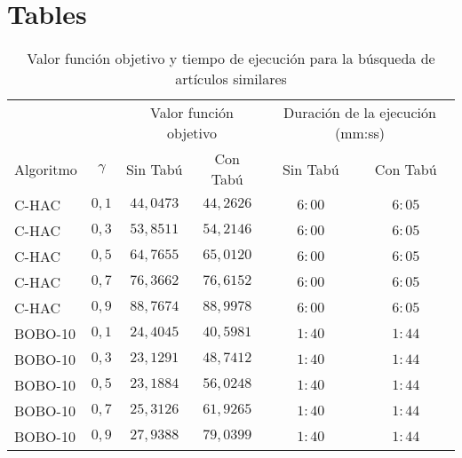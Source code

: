 \appendix
\section{Tables}\label{appendix-tables}
\begin{table}[H]
	\centering
	\resizebox{.4\textwidth}{!} {
		\begin{tabular}{|lc|cccc|}
			\hline
			~  & ~ & \multicolumn{2}{|c}{Valor función objetivo} & \multicolumn{2}{c|}{Duración de la ejecución (mm:ss)} \\
			Algoritmo & $\gamma$ & Sin Tabú & Con Tabú & Sin Tabú & Con Tabú \\ 
			\hline
			C-HAC & $0,1$ & $44,0473$  & $44,2626$ & $6:00$ & $6:05$ \\
			C-HAC & $0,3$ & $53,8511$  & $54,2146$ & $6:00$ & $6:05$ \\
			C-HAC & $0,5$ & $64,7655$  & $65,0120$ & $6:00$ & $6:05$ \\
			C-HAC & $0,7$ & $76,3662$  & $76,6152$ & $6:00$ & $6:05$ \\
			C-HAC & $0,9$ & $88,7674$  & $88,9978$ & $6:00$ & $6:05$ \\
			BOBO-10 & $0,1$ & $24,4045$  & $40,5981$ & $1:40$ & $1:44$ \\
			BOBO-10 & $0,3$ & $23,1291$  & $48,7412$ & $1:40$ & $1:44$ \\
			BOBO-10 & $0,5$ & $23,1884$  & $56,0248$ & $1:40$ & $1:44$ \\
			BOBO-10 & $0,7$ & $25,3126$  & $61,9265$ & $1:40$ & $1:44$ \\
			BOBO-10 & $0,9$ & $27,9388$  & $79,0399$ & $1:40$ & $1:44$ \\
			\hline
		\end{tabular}
	}
	\caption {Valor función objetivo y tiempo de ejecución para la búsqueda de artículos similares}
\end{table}

